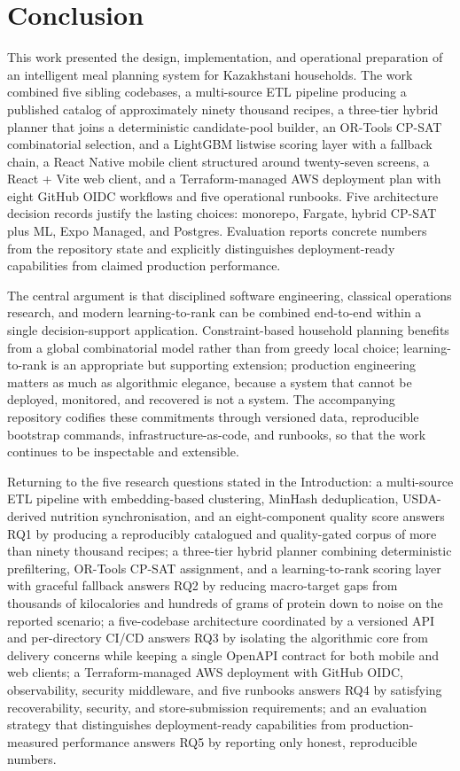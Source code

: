 %
%
\chapter{Conclusion}
\setlength{\parskip}{1em}

This work presented the design, implementation, and operational preparation of an intelligent meal planning system for Kazakhstani households. The work combined five sibling codebases, a multi-source ETL pipeline producing a published catalog of approximately ninety thousand recipes, a three-tier hybrid planner that joins a deterministic candidate-pool builder, an OR-Tools CP-SAT combinatorial selection, and a LightGBM listwise scoring layer with a fallback chain, a React Native mobile client structured around twenty-seven screens, a React + Vite web client, and a Terraform-managed AWS deployment plan with eight GitHub OIDC workflows and five operational runbooks. Five architecture decision records justify the lasting choices: monorepo, Fargate, hybrid CP-SAT plus ML, Expo Managed, and Postgres. Evaluation reports concrete numbers from the repository state and explicitly distinguishes deployment-ready capabilities from claimed production performance.

The central argument is that disciplined software engineering, classical operations research, and modern learning-to-rank can be combined end-to-end within a single decision-support application. Constraint-based household planning benefits from a global combinatorial model rather than from greedy local choice; learning-to-rank is an appropriate but supporting extension; production engineering matters as much as algorithmic elegance, because a system that cannot be deployed, monitored, and recovered is not a system. The accompanying repository codifies these commitments through versioned data, reproducible bootstrap commands, infrastructure-as-code, and runbooks, so that the work continues to be inspectable and extensible.

Returning to the five research questions stated in the Introduction: a multi-source ETL pipeline with embedding-based clustering, MinHash deduplication, USDA-derived nutrition synchronisation, and an eight-component quality score answers RQ1 by producing a reproducibly catalogued and quality-gated corpus of more than ninety thousand recipes; a three-tier hybrid planner combining deterministic prefiltering, OR-Tools CP-SAT assignment, and a learning-to-rank scoring layer with graceful fallback answers RQ2 by reducing macro-target gaps from thousands of kilocalories and hundreds of grams of protein down to noise on the reported scenario; a five-codebase architecture coordinated by a versioned API and per-directory CI/CD answers RQ3 by isolating the algorithmic core from delivery concerns while keeping a single OpenAPI contract for both mobile and web clients; a Terraform-managed AWS deployment with GitHub OIDC, observability, security middleware, and five runbooks answers RQ4 by satisfying recoverability, security, and store-submission requirements; and an evaluation strategy that distinguishes deployment-ready capabilities from production-measured performance answers RQ5 by reporting only honest, reproducible numbers.

